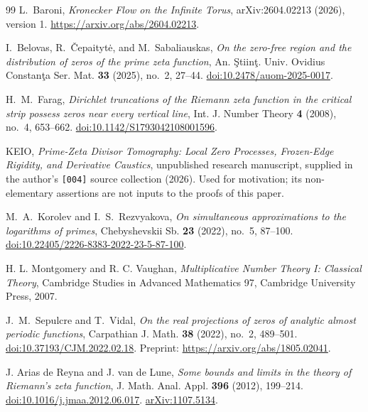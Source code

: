 \documentclass[11pt,letterpaper]{article}
\theoremstyle{definition}
\theoremstyle{remark}
\newcommand{\1}{\mathbf 1}
\begin{document}
\begin{thebibliography}{99}
L.~Baroni,
\emph{Kronecker Flow on the Infinite Torus},
arXiv:2604.02213 (2026), version 1.
\url{https://arxiv.org/abs/2604.02213}.


I.~Belovas, R.~\v{C}epaityt\.{e}, and M.~Sabaliauskas,
\emph{On the zero-free region and the distribution of zeros of the
prime zeta function},
An. \c{S}tiin\c{t}. Univ. Ovidius Constan\c{t}a Ser. Mat.
\textbf{33} (2025), no.~2, 27--44.
\href{https://doi.org/10.2478/auom-2025-0017}{doi:10.2478/auom-2025-0017}.


H.~M.~Farag,
\emph{Dirichlet truncations of the Riemann zeta function in the
critical strip possess zeros near every vertical line},
Int. J. Number Theory \textbf{4} (2008), no.~4, 653--662.
\href{https://doi.org/10.1142/S1793042108001596}{doi:10.1142/S1793042108001596}.


KEIO,
\emph{Prime-Zeta Divisor Tomography: Local Zero Processes,
Frozen-Edge Rigidity, and Derivative Caustics},
unpublished research manuscript, supplied in the author's
\texttt{[004]} source collection (2026).
Used for motivation; its non-elementary assertions are not inputs
to the proofs of this paper.


M.~A.~Korolev and I.~S.~Rezvyakova,
\emph{On simultaneous approximations to the logarithms of primes},
Chebyshevskii Sb. \textbf{23} (2022), no.~5, 87--100.
\href{https://doi.org/10.22405/2226-8383-2022-23-5-87-100}
{doi:10.22405/2226-8383-2022-23-5-87-100}.


H. L. Montgomery and R. C. Vaughan,
\emph{Multiplicative Number Theory I: Classical Theory},
Cambridge Studies in Advanced Mathematics 97,
Cambridge University Press, 2007.


J.~M.~Sepulcre and T.~Vidal,
\emph{On the real projections of zeros of analytic almost periodic
functions},
Carpathian J. Math. \textbf{38} (2022), no.~2, 489--501.
\href{https://doi.org/10.37193/CJM.2022.02.18}{doi:10.37193/CJM.2022.02.18}.
Preprint: \url{https://arxiv.org/abs/1805.02041}.


J. Arias de Reyna and J. van de Lune,
\emph{Some bounds and limits in the theory of Riemann's zeta function},
J. Math. Anal. Appl. \textbf{396} (2012), 199--214.
\href{https://doi.org/10.1016/j.jmaa.2012.06.017}{doi:10.1016/j.jmaa.2012.06.017}.
\href{https://arxiv.org/abs/1107.5134}{arXiv:1107.5134}.



\end{thebibliography}
\end{document}
